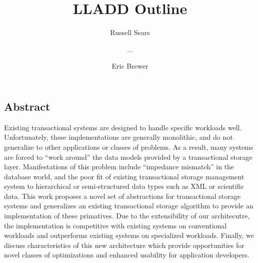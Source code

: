 \documentclass[letterpaper,english]{article}
\begin{document}
\title{LLADD Outline }


\author{Russell Sears \and ... \and Eric Brewer}

\maketitle



\subsection*{Abstract}

Existing transactional systems are designed to handle specific
workloads well.  Unfortunately, these implementations are generally
monolithic, and do not generalize to other applications or classes of
problems.  As a result, many systems are forced to ``work around'' the
data models provided by a transactional storage layer. Manifestations
of this problem include ``impedance mismatch'' in the database world,
and the poor fit of existing transactional storage management system
to hierarchical or semi-structured data types such as XML or
scientific data.  This work proposes a novel set of abstractions for
transactional storage systems and generalizes an existing
transactional storage algorithm to provide an implementation of these
primatives.  Due to the extensibility of our architecutre, the
implementation is competitive with existing systems on conventional
workloads and outperforms existing systems on specialized
workloads.  Finally, we discuss characteristics of this new
architecture which provide opportunities for novel classes of
optimizations and enhanced usability for application developers.


\end{document}
